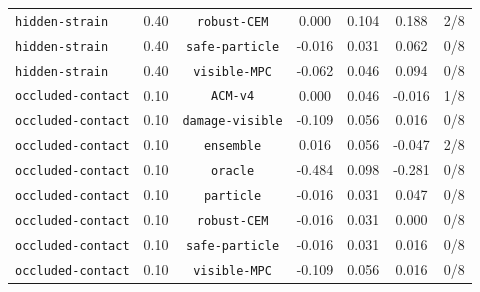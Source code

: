 \documentclass{article}
\begin{document}
\begin{center}
\begin{tabular}{llccccc}
\texttt{hidden-strain} & 0.40 & \texttt{robust-CEM} & 0.000 & 0.104 & 0.188 & 2/8 \\
\texttt{hidden-strain} & 0.40 & \texttt{safe-particle} & -0.016 & 0.031 & 0.062 & 0/8 \\
\texttt{hidden-strain} & 0.40 & \texttt{visible-MPC} & -0.062 & 0.046 & 0.094 & 0/8 \\
\texttt{occluded-contact} & 0.10 & \texttt{ACM-v4} & 0.000 & 0.046 & -0.016 & 1/8 \\
\texttt{occluded-contact} & 0.10 & \texttt{damage-visible} & -0.109 & 0.056 & 0.016 & 0/8 \\
\texttt{occluded-contact} & 0.10 & \texttt{ensemble} & 0.016 & 0.056 & -0.047 & 2/8 \\
\texttt{occluded-contact} & 0.10 & \texttt{oracle} & -0.484 & 0.098 & -0.281 & 0/8 \\
\texttt{occluded-contact} & 0.10 & \texttt{particle} & -0.016 & 0.031 & 0.047 & 0/8 \\
\texttt{occluded-contact} & 0.10 & \texttt{robust-CEM} & -0.016 & 0.031 & 0.000 & 0/8 \\
\texttt{occluded-contact} & 0.10 & \texttt{safe-particle} & -0.016 & 0.031 & 0.016 & 0/8 \\
\texttt{occluded-contact} & 0.10 & \texttt{visible-MPC} & -0.109 & 0.056 & 0.016 & 0/8 \\
\bottomrule
\end{tabular}
\end{center}
\end{document}
